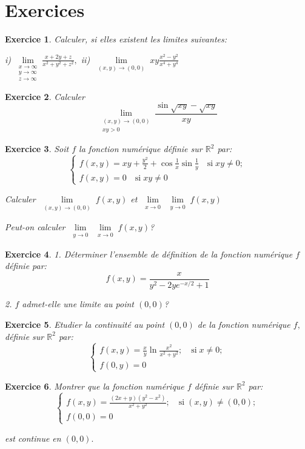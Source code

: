 \documentclass[11pt,a4paper]{report}
\newtheorem{exo}{Exercice}[section]
\begin{document}
\section{Exercices}

\begin{exo}
Calculer, si elles existent les limites suivantes:

i) $\lim\limits_{\substack{x \rightarrow \infty \\ y\rightarrow \infty\\ z \rightarrow \infty}}\frac{x+2y+z}{x^2+y^2+z^2},$ \quad  ii) $\lim\limits_{\substack{(x,y) \rightarrow (0,0) }}xy\frac{x^2-y^2}{x^4+y^4}$
\end{exo}
\begin{exo}
Calculer
$$\lim\limits_{\substack{(x,y) \rightarrow (0,0) \\ xy>0}}\frac{\sin \sqrt{xy}-\sqrt{xy}}{xy}$$
\end{exo}
\begin{exo}
Soit $f$ la fonction numérique définie sur $\mathbb{R}^2$ par:
$$\begin{cases}
f(x,y)=xy+\frac{y^2}{2}+\cos\frac{1}{x}\sin\frac{1}{y}\quad\mbox{si}\;xy\neq0; \\
f(x,y)=0 \quad\mbox{si}\;xy\neq0
\end{cases}$$

Calculer $\lim\limits_{\substack{(x,y) \rightarrow (0,0) }}f(x,y)$ et $\lim\limits_{\substack{x\rightarrow 0}}\lim\limits_{\substack{y\rightarrow 0}}f(x,y)$

Peut-on calculer $\lim\limits_{\substack{y\rightarrow 0}}\lim\limits_{\substack{x\rightarrow 0}}f(x,y)$?
\end{exo}
\begin{exo}

1. Déterminer l'ensemble de définition de la fonction numérique $f$ définie par:
$$f(x,y)=\frac{x}{y^2-2ye^{-x/2}+1}$$

2. $f$ admet-elle une limite au point $(0,0)$?
\end{exo}
\begin{exo}
Etudier la continuité au point $(0,0)$ de la fonction numérique $f,$ définie sur $\mathbb{R}^2$ par:
$$\begin{cases}
f(x,y)=\frac{x}{y}\ln\frac{x^2}{x^2+y^2}; \quad\mbox{si}\;x\neq0;\\
f(0,y)=0
\end{cases}$$
\end{exo}
\begin{exo}
Montrer que la fonction numérique $f$ définie sur $\mathbb{R}^2$ par:
$$\begin{cases}
f(x,y)=\frac{(2x+y)(y^2-x^2)}{x^2+y^2}; \quad\mbox{si}\;(x,y)\neq(0,0);\\
f(0,0)=0
\end{cases}$$

est continue en $(0,0).$
\end{exo}
\end{document}
